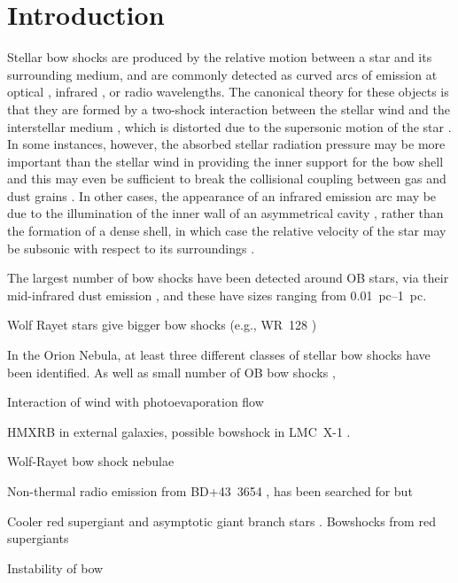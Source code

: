 
\section{Introduction}
\label{sec:introduction}

Stellar bow shocks are produced by the relative motion between a star
and its surrounding medium, and are commonly detected as curved arcs
of emission at optical \citep{Gull:1979a, Brown:2005a}, infrared
\citep{van-Buren:1988a, Kobulnicky:2016a}, or radio
\citep{van-Buren:1990a, Benaglia:2010a} wavelengths.  The canonical
theory for these objects is that they are formed by a two-shock
interaction between the stellar wind and the interstellar medium
\citep{Pikelner:1968a, Dyson:1972a}, which is distorted due to the
supersonic motion of the star \citep{Baranov:1970a, Wilkin:1996a}.  In
some instances, however, the absorbed stellar radiation pressure may
be more important than the stellar wind in providing the inner support
for the bow shell \citep[Paper~I]{Henney:2019a} and this may even be
sufficient to break the collisional coupling between gas and dust
grains \citep[Paper~II]{Henney:2019b}.  In other cases, the appearance
of an infrared emission arc may be due to the illumination of the
inner wall of an asymmetrical cavity \citep{Mackey:2016a}, rather than
the formation of a dense shell, in which case the relative velocity of
the star may be subsonic with respect to its surroundings
\citep{Mackey:2015a}.

The largest number of bow shocks have been detected around OB stars,
via their mid-infrared dust emission \citep{van-Buren:1995a,
  Smith:2005a, Povich:2008a, Kobulnicky:2010a, Peri:2012a, Peri:2015a,
  Sexton:2015b, Kobulnicky:2016a, Bodensteiner:2018a}, and these have
sizes ranging from \SIrange{0.01}{1}{pc}. 

Wolf Rayet stars give bigger bow shocks (e.g., WR~128 \citealp{Moffat:1998})

In the Orion Nebula, at least three different classes of stellar bow
shocks have been identified. As well as small number of OB bow shocks \citep{Smith:2005a, ODell:2001c}, 

Interaction of wind with photoevaporation flow \citep{Dyson:1975a}

HMXRB in external galaxies, possible bowshock in LMC~X-1 \citep{Hyde:2017a}.

Wolf-Rayet bow shock nebulae \citep{Dyson:1989a}

Non-thermal radio emission from BD+43~3654 \citep{Benaglia:2010a}, has
been searched for but

Cooler red supergiant and asymptotic giant branch stars
\citep{Ueta:2008a, Sahai:2010a, Cox:2012a}. 
Bowshocks from red supergiants \citep{Meyer:2014a}


Instability of bow \citep{Blondin:1998a}

